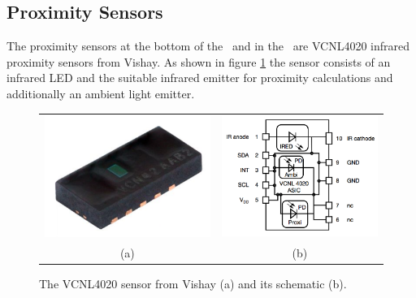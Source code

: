 \subsection{Proximity Sensors}
\label{sec:proxsensors}

The proximity sensors at the bottom of the \amiro\ and in the \proxring\ are VCNL4020 infrared proximity sensors from Vishay. As shown in figure \ref{fig:proxis} the sensor consists of an infrared LED and the suitable infrared emitter for proximity calculations and additionally an ambient light emitter.

\begin{figure}[htb]
\begin{center}
\begin{tabular}{cc}
\includegraphics[scale=0.2]{Bilder/VCNL4020-Sensor.png} &
\includegraphics[scale=0.2]{Bilder/VCNL4020-Schematic.png} \\
(a) & (b) \\
\end{tabular}
\caption{The VCNL4020 sensor from Vishay (a) and its schematic (b).}
\label{fig:proxis}
\end{center}
\end{figure}

